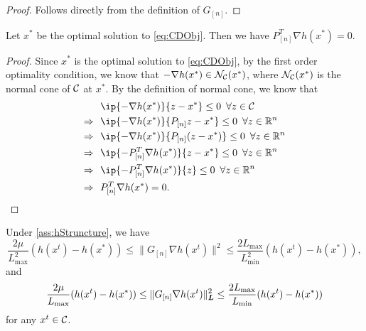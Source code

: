 \begin{proof}
    Follows directly from the definition of $G_{[n]}$. 
\end{proof}

\begin{lemma} \label{lemma:gradient_optimal}
    Let $x^*$ be the optimal solution to \autoref{eq:CDObj}. Then we have $P_{[n]}^T\nabla h(x^*) = 0$. 
\end{lemma}

\begin{proof}
    Since $x^*$ is the optimal solution to \autoref{eq:CDObj}, by the first order optimality condition, we know that $-\nabla h(x^*) \in \mathcal{N}_{\mathcal{C}}(x^*)$, where $\mathcal{N}_{\mathcal{C}}(x^*)$ is the normal cone of $\mathcal{C}$ at $x^*$. By the definition of normal cone, we know that 
    \begin{align*}
                    ~&~ \ip{-\nabla h(x^*)}{z - x^*} \leq 0 \enspace\forall z \in \Cscr \\
        \Rightarrow ~&~ \ip{-\nabla h(x^*)}{P_{[n]} z - x^*} \leq 0 \enspace\forall z \in \Real^n \\
        \Rightarrow ~&~ \ip{-\nabla h(x^*)}{P_{[n]} (z - x^*)} \leq 0 \enspace\forall z \in \Real^n \\
        \Rightarrow ~&~ \ip{-P_{[n]}^T \nabla h(x^*)}{z - x^*} \leq 0 \enspace\forall z \in \Real^n \\
        \Rightarrow ~&~ \ip{-P_{[n]}^T \nabla h(x^*)}{z} \leq 0 \enspace\forall z \in \Real^n \\
        \Rightarrow ~&~ P_{[n]}^T \nabla h(x^*) = 0.
    \end{align*}
\end{proof}

\begin{lemma} \label{lemma:GnormLowerAndUpperBound}
    Under \autoref{ass:hStruncture}, we have 
    \[\frac{2\mu}{L_{\max}^2}(h(x^t) - h(x^*)) \leq \|G_{[n]}\nabla h(x^t)\|^2 \leq \frac{2L_{\max}}{L_{\min}^2}(h(x^t) - h(x^*)),\]
    and
    \[\frac{2\mu}{L_{\max}}(h(x^t) - h(x^*)) \leq \|G_{[n]}\nabla h(x^t)\|_{\boldsymbol{L}}^2 \leq \frac{2L_{\max}}{L_{\min}}(h(x^t) - h(x^*))\]
    for any $x^t \in \mathcal{C}$.
\end{lemma}

